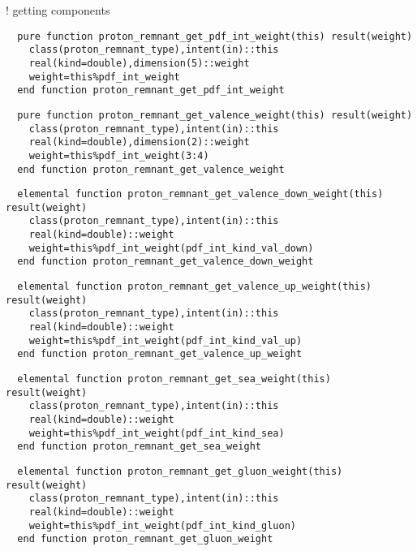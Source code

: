   ! getting components

\begin{Verbatim}
  pure function proton_remnant_get_pdf_int_weight(this) result(weight)
    class(proton_remnant_type),intent(in)::this
    real(kind=double),dimension(5)::weight
    weight=this%pdf_int_weight
  end function proton_remnant_get_pdf_int_weight
\end{Verbatim}

\begin{Verbatim}
  pure function proton_remnant_get_valence_weight(this) result(weight)
    class(proton_remnant_type),intent(in)::this
    real(kind=double),dimension(2)::weight
    weight=this%pdf_int_weight(3:4)
  end function proton_remnant_get_valence_weight
\end{Verbatim}
  
\begin{Verbatim}
  elemental function proton_remnant_get_valence_down_weight(this) result(weight)
    class(proton_remnant_type),intent(in)::this
    real(kind=double)::weight
    weight=this%pdf_int_weight(pdf_int_kind_val_down)
  end function proton_remnant_get_valence_down_weight
\end{Verbatim}

\begin{Verbatim}
  elemental function proton_remnant_get_valence_up_weight(this) result(weight)
    class(proton_remnant_type),intent(in)::this
    real(kind=double)::weight
    weight=this%pdf_int_weight(pdf_int_kind_val_up)
  end function proton_remnant_get_valence_up_weight
\end{Verbatim}

\begin{Verbatim}
  elemental function proton_remnant_get_sea_weight(this) result(weight)
    class(proton_remnant_type),intent(in)::this
    real(kind=double)::weight
    weight=this%pdf_int_weight(pdf_int_kind_sea)
  end function proton_remnant_get_sea_weight
\end{Verbatim}

\begin{Verbatim}
  elemental function proton_remnant_get_gluon_weight(this) result(weight)
    class(proton_remnant_type),intent(in)::this
    real(kind=double)::weight
    weight=this%pdf_int_weight(pdf_int_kind_gluon)
  end function proton_remnant_get_gluon_weight
\end{Verbatim}

